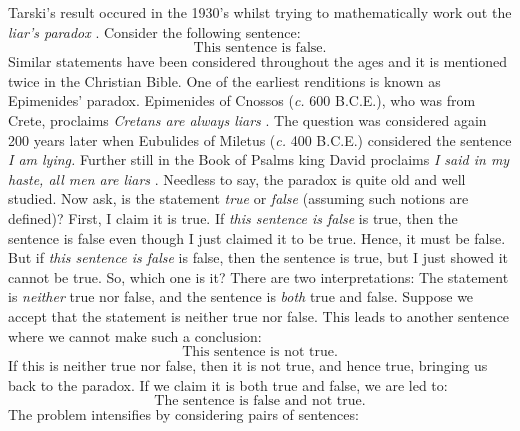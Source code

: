         Tarski's result occured in the 1930's whilst trying to
        mathematically work out the
        \textit{liar's paradox}
        \cite{TarskiUndefinability}. Consider the following sentence:
        \begin{equation}
            \text{This sentence is false.}
        \end{equation}
        Similar statements have been considered throughout the ages and
        it is mentioned twice in the Christian Bible. One of the earliest
        renditions is known as Epimenides' paradox.
        Epimenides of Cnossos (\textit{c.} 600 B.C.E.), who was from Crete,
        proclaims \textit{Cretans are always liars} \cite{KingJamesBible}. The
        question was considered again 200 years later when Eubulides of Miletus
        (\textit{c.} 400 B.C.E.) considered the sentence \textit{I am lying.}
        Further still in the Book of Psalms king David proclaims
        \textit{I said in my haste, all men are liars} \cite{KingJamesBible}.
        Needless to say, the paradox is quite old and well studied. Now ask,
        is the statement \textit{true} or \textit{false} (assuming such notions
        are defined)? First, I claim it is true. If
        \textit{this sentence is false} is true, then the sentence is false even
        though I just claimed it to be true. Hence, it must be false. But if
        \textit{this sentence is false} is false, then the sentence is true, but
        I just showed it cannot be true. So, which one is it? There are two
        interpretations: The statement is \textit{neither} true nor false, and
        the sentence is \textit{both} true and false. Suppose we accept that
        the statement is neither true nor false. This leads to another sentence
        where we cannot make such a conclusion:
        \begin{equation}
            \text{This sentence is not true.}
        \end{equation}
        If this is neither true nor false, then it is not true, and hence true,
        bringing us back to the paradox. If we claim it is both true and false,
        we are led to:
        \begin{equation}
            \text{The sentence is false and not true.}
        \end{equation}
        The problem intensifies by considering pairs of sentences:
